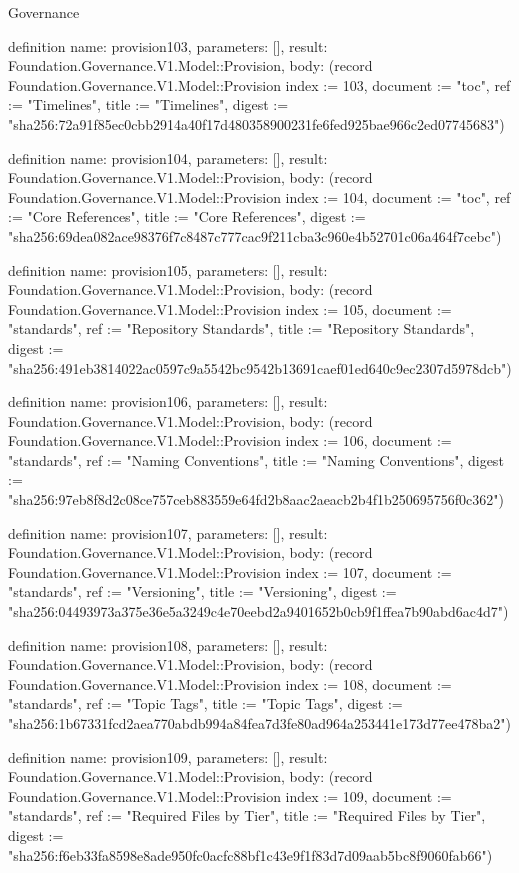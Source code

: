 \begin{lexlean}{Governance}
\begin{semanticmodule}
definition{
  name: provision103,
  parameters: [],
  result: Foundation.Governance.V1.Model::Provision,
  body: (record Foundation.Governance.V1.Model::Provision {index := 103, document := "toc", ref := "Timelines", title := "Timelines", digest := "sha256:72a91f85ec0cbb2914a40f17d480358900231fe6fed925bae966c2ed07745683"})
}

definition{
  name: provision104,
  parameters: [],
  result: Foundation.Governance.V1.Model::Provision,
  body: (record Foundation.Governance.V1.Model::Provision {index := 104, document := "toc", ref := "Core References", title := "Core References", digest := "sha256:69dea082ace98376f7c8487c777cac9f211cba3c960e4b52701c06a464f7cebc"})
}

definition{
  name: provision105,
  parameters: [],
  result: Foundation.Governance.V1.Model::Provision,
  body: (record Foundation.Governance.V1.Model::Provision {index := 105, document := "standards", ref := "Repository Standards", title := "Repository Standards", digest := "sha256:491eb3814022ac0597c9a5542bc9542b13691caef01ed640c9ec2307d5978dcb"})
}

definition{
  name: provision106,
  parameters: [],
  result: Foundation.Governance.V1.Model::Provision,
  body: (record Foundation.Governance.V1.Model::Provision {index := 106, document := "standards", ref := "Naming Conventions", title := "Naming Conventions", digest := "sha256:97eb8f8d2c08ce757ceb883559e64fd2b8aac2aeacb2b4f1b250695756f0c362"})
}

definition{
  name: provision107,
  parameters: [],
  result: Foundation.Governance.V1.Model::Provision,
  body: (record Foundation.Governance.V1.Model::Provision {index := 107, document := "standards", ref := "Versioning", title := "Versioning", digest := "sha256:04493973a375e36e5a3249c4e70eebd2a9401652b0cb9f1ffea7b90abd6ac4d7"})
}

definition{
  name: provision108,
  parameters: [],
  result: Foundation.Governance.V1.Model::Provision,
  body: (record Foundation.Governance.V1.Model::Provision {index := 108, document := "standards", ref := "Topic Tags", title := "Topic Tags", digest := "sha256:1b67331fcd2aea770abdb994a84fea7d3fe80ad964a253441e173d77ee478ba2"})
}

definition{
  name: provision109,
  parameters: [],
  result: Foundation.Governance.V1.Model::Provision,
  body: (record Foundation.Governance.V1.Model::Provision {index := 109, document := "standards", ref := "Required Files by Tier", title := "Required Files by Tier", digest := "sha256:f6eb33fa8598e8ade950fc0acfc88bf1c43e9f1f83d7d09aab5bc8f9060fab66"})
}


\end{semanticmodule}
\end{lexlean}
